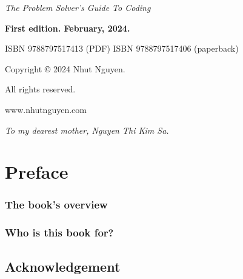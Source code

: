 

\usepackage[paperwidth=7.5in,paperheight=9.25in]{geometry}

\date{March, 2024}
% 
\frontmatter


\textit{The Problem Solver's Guide To Coding} 

\textbf{First edition. February, 2024.} 

ISBN 9788797517413 (PDF)
ISBN 9788797517406 (paperback)

Copyright © 2024 Nhut Nguyen.

All rights reserved.

www.nhutnguyen.com

\newpage
\begin{center}
    \textit{To my dearest mother, Nguyen Thi Kim Sa.}
\end{center}

\sphinxstepscope



\chapter*{Preface}

\subsection*{The book’s overview}

\subsection*{Who is this book for?}

\section*{Acknowledgement}

\newpage




\mainmatter

